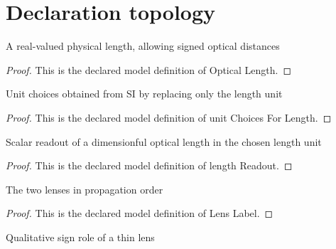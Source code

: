 \section{Declaration topology}
\begin{definition}
  \label{def:physics:phyx-mini-0112:phyxminiproblems-problemphyxmini0112-opticallength}
  A real-valued physical length, allowing signed optical distances
\end{definition}
\begin{proof}
  This is the declared model definition of Optical Length.
\end{proof}
\begin{definition}
  \label{def:physics:phyx-mini-0112:phyxminiproblems-problemphyxmini0112-unitchoicesforlength}
  Unit choices obtained from SI by replacing only the length unit
\end{definition}
\begin{proof}
  This is the declared model definition of unit Choices For Length.
\end{proof}
\begin{definition}
  \label{def:physics:phyx-mini-0112:phyxminiproblems-problemphyxmini0112-lengthreadout}
  Scalar readout of a dimensionful optical length in the chosen length unit
\end{definition}
\begin{proof}
  This is the declared model definition of length Readout.
\end{proof}
\begin{definition}
  \label{def:physics:phyx-mini-0112:phyxminiproblems-problemphyxmini0112-lenslabel}
  The two lenses in propagation order
\end{definition}
\begin{proof}
  This is the declared model definition of Lens Label.
\end{proof}
\begin{definition}
  \label{def:physics:phyx-mini-0112:phyxminiproblems-problemphyxmini0112-thinlenskind}
  Qualitative sign role of a thin lens
\end{definition}
